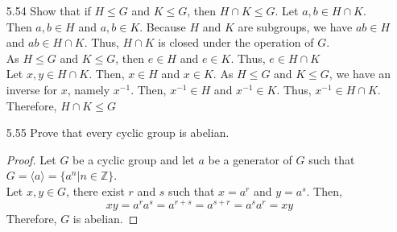 \documentclass[12pt]{article}
\newcommand{\Z}{\mathds{Z}}
\begin{document}
\begin{enumerate}
		\item[5.54] Show that if $H \leq G$ and $K \leq G$, then $H\cap K \leq G$.
		Let $ a,b \in H\cap K. $ Then $ a,b\in H $ and $ a,b \in K $. Because $ H $ and $ K $ are subgroups, we have $ ab\in H $ and $ ab\in H\cap K $. Thus, $ H\cap K $ is closed under the operation of $ G $. \\
		 As $ H\leq G $ and $ K \leq G $, then $ e\in H $ and $ e\in K $. Thus, $ e\in H \cap K $\\
		Let $ x,y \in H \cap K $. Then, $ x\in H $ and $ x\in K $. As $ H \leq G $ and $ K \leq G $, we have an inverse for $ x $, namely $ x^{-1} $. Then, $ x^{-1}\in H $ and $ x^{-1}\in K $. Thus, $ x^{-1}\in H \cap K $.\\
		Therefore, $ H \cap K \leq G$
		\item[5.55] Prove that every cyclic group is abelian.
			\begin{proof}
				Let $ G $ be a cyclic group and let $ a $ be a generator of $ G $ such that $ G = \langle a \rangle = \{a^n|n\in\Z\} $. \\
				Let $ x,y \in G $, there exist $ r $ and $ s $ such that $ x=a^r $ and $ y=a^s $. Then,
				\[xy=a^ra^s=a^{r+s}=a^{s+r}=a^sa^r=xy\]
				Therefore, $ G $ is abelian.
			\end{proof}
		
	\end{enumerate}
\end{document}
